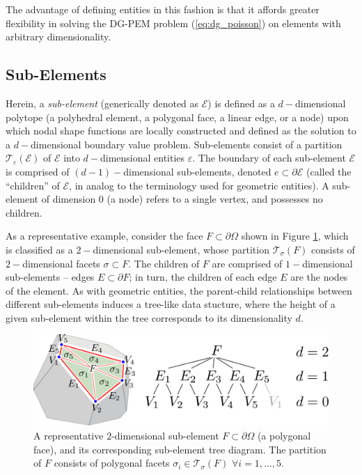 	The advantage of defining entities in this fashion is that it affords greater flexibility in solving the DG-PEM problem (\ref{eq:dg_poisson}) on elements with arbitrary dimensionality.
	
\subsection*{Sub-Elements}

	Herein, a \textit{sub-element} (generically denoted as $\mathcal{E}$) is defined as a $d-$dimensional polytope (a polyhedral element, a polygonal face, a linear edge, or a node) upon which nodal shape functions are locally constructed and defined as the solution to a $d-$dimensional boundary value problem. Sub-elements consist of a partition $\mathcal{T}_{\varepsilon} (\mathcal{E})$ of $\mathcal{E}$ into $d-$dimensional entities $\varepsilon$. The boundary of each sub-element $\mathcal{E}$ is comprised of $(d-1)-$dimensional sub-elements, denoted $e \subset \partial \mathcal{E}$ (called the ``children'' of $\mathcal{E}$, in analog to the terminology used for geometric entities). A sub-element of dimension $0$ (a node) refers to a single vertex, and possesses no children.
	
	As a representative example, consider the face $F \subset \partial \Omega$ shown in Figure \ref{fig:sub_element}, which is classified as a $2-$dimensional sub-element, whose partition $\mathcal{T}_\sigma (F)$ consists of $2-$dimensional facets $\sigma \subset F$. The children of $F$ are comprised of $1-$dimensional sub-elements -- edges $E \subset \partial F$; in turn, the children of each edge $E$ are the nodes of the element. As with geometric entities, the parent-child relationships between different sub-elements induces a tree-like data stucture, where the height of a given sub-element within the tree corresponds to its dimensionality $d$.
	\begin{figure} [!ht]
		\centering
		\includegraphics[width = 6.0in]{figures/sub_element.pdf}
		\caption{A representative $2$-dimensional sub-element $F \subset \partial \Omega$ (a polygonal face), and its corresponding sub-element tree diagram. The partition of $F$ consists of polygonal facets $\sigma_i \in \mathcal{T}_{\sigma} (F) \, \, \forall i = 1, \ldots, 5$.}
		\label{fig:sub_element}
	\end{figure}
	
